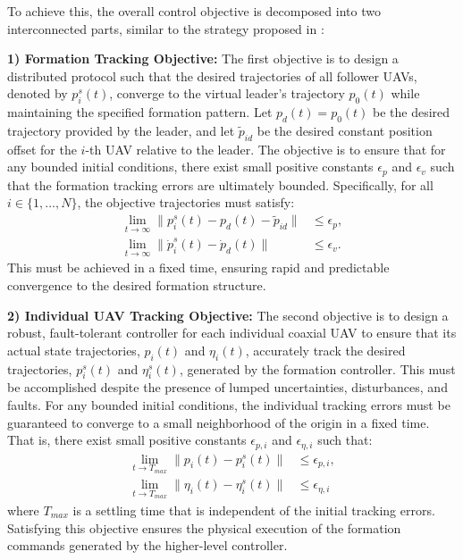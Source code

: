 To achieve this, the overall control objective is decomposed into two interconnected parts, similar to the strategy proposed in \cite{Yu2023Distributed}:

\textbf{1) Formation Tracking Objective:}
The first objective is to design a distributed protocol such that the desired trajectories of all follower UAVs, denoted by $p_i^s(t)$, converge to the virtual leader's trajectory $p_0(t)$ while maintaining the specified formation pattern. Let $p_d(t) = p_0(t)$ be the desired trajectory provided by the leader, and let $\tilde{p}_{id}$ be the desired constant position offset for the $i$-th UAV relative to the leader. The objective is to ensure that for any bounded initial conditions, there exist small positive constants $\epsilon_p$ and $\epsilon_v$ such that the formation tracking errors are ultimately bounded. Specifically, for all $i \in \{1, \dots, N\}$, the objective trajectories must satisfy:
\begin{align}
    \lim_{t \to \infty} \| p_i^s(t) - p_d(t) - \tilde{p}_{id} \| &\le \epsilon_p, \\
    \lim_{t \to \infty} \| \dot{p}_i^s(t) - \dot{p}_d(t) \| &\le \epsilon_v.
    \label{eq:formation_objective}
\end{align}
This must be achieved in a fixed time, ensuring rapid and predictable convergence to the desired formation structure.

\textbf{2) Individual UAV Tracking Objective:}
The second objective is to design a robust, fault-tolerant controller for each individual coaxial UAV to ensure that its actual state trajectories, $p_i(t)$ and $\eta_i(t)$, accurately track the desired trajectories, $p_i^s(t)$ and $\eta_i^s(t)$, generated by the formation controller. This must be accomplished despite the presence of lumped uncertainties, disturbances, and faults. For any bounded initial conditions, the individual tracking errors must be guaranteed to converge to a small neighborhood of the origin in a fixed time. That is, there exist small positive constants $\epsilon_{p,i}$ and $\epsilon_{\eta,i}$ such that:
\begin{align}
    \lim_{t \to T_{max}} \| p_i(t) - p_i^s(t) \| &\le \epsilon_{p,i}, \\
    \lim_{t \to T_{max}} \| \eta_i(t) - \eta_i^s(t) \| &\le \epsilon_{\eta,i}
\end{align}
where $T_{max}$ is a settling time that is independent of the initial tracking errors. Satisfying this objective ensures the physical execution of the formation commands generated by the higher-level controller.

